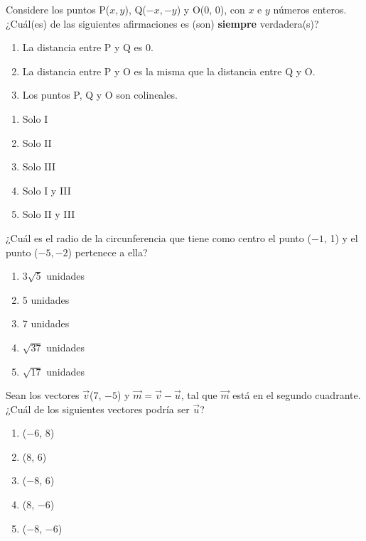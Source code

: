 \begin{enumerate}[label=\large{\textbf{\arabic*.}}, itemsep = 0.15cm, topsep = 0.5cm]
	
	\parbox{1\linewidth}{ \item Considere los puntos P($x, y$), Q($-x, -y$) y O(0, 0), con $x$ e $y$ números enteros. ¿Cuál(es) de las siguientes afirmaciones es (son) \textbf{siempre} verdadera(s)? 	
		\begin{enumerate}[label={\Roman*)}, itemsep = 0.5cm, topsep = 0.5cm, leftmargin = 2.4cm]
			\item La distancia entre P y Q es 0.
			\item La distancia entre P y O es la misma que la distancia entre Q y O. 
			\item Los puntos P, Q y O son colineales.
		\end{enumerate}
		\begin{enumerate}[label={\Alph*)}, itemsep = 0.15cm, topsep = 0.3cm]
			\item Solo I
			\item Solo II
			\item Solo III
			\item Solo I y III
			\item Solo II y III
	\end{enumerate}}
	
	\newpage
	\vspace*{-1.2cm}
	
	\parbox{1\linewidth}{ \item ¿Cuál es el radio de la circunferencia que tiene como centro el punto ($-1$, 1) y el punto ($-5, -2$) pertenece a ella? 	
		\begin{enumerate}[label={\Alph*)}, itemsep = 0.15cm, topsep = 0.5cm]
			\item $3\sqrt{5}$ unidades 
			\item 5 unidades
			\item 7 unidades
			\item $\sqrt{37}$ unidades 
			\item $\sqrt{17}$ unidades
	\end{enumerate}}
	
	\parbox{1\linewidth}{ \item Sean los vectores $\vec{v}$(7, $-5$) y $\vec{m} = \vec{v} - \vec{u}$, tal que $\vec{m}$ está en el segundo cuadrante. ¿Cuál de los siguientes vectores podría ser $\vec{u}$? 	
		\begin{enumerate}[label={\Alph*)}, itemsep = 0.15cm, topsep = 0.5cm]
			\item ($-6$, 8)
			\item (8, 6)
			\item ($-8$, 6)
			\item (8, $-6$)
			\item ($-8$, $-6$)
	\end{enumerate}}
	

\end{enumerate}
